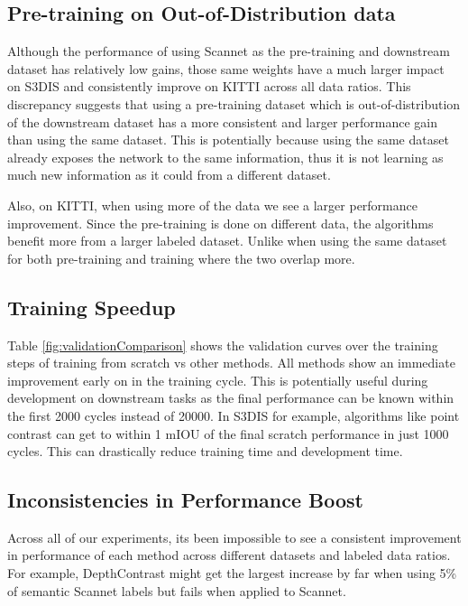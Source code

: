\documentclass[10pt,twocolumn,letterpaper]{article}
\begin{document}
\subsection{Pre-training on Out-of-Distribution data}
\label{sec:results:out-of-distribution}

Although the performance of using Scannet as the pre-training and downstream dataset has relatively low gains, those same weights have a much larger impact on S3DIS and consistently improve on KITTI across all data ratios. This discrepancy suggests that using a pre-training dataset which is out-of-distribution of the downstream dataset has a more consistent and larger performance gain than using the same dataset. This is potentially because using the same dataset already exposes the network to the same information, thus it is not learning as much new information as it could from a different dataset.

Also, on KITTI, when using more of the data we see a larger performance improvement. Since the pre-training is done on different data, the algorithms benefit more from a larger labeled dataset. Unlike when using the same dataset for both pre-training and training where the two overlap more.

\subsection{Training Speedup}
\label{sec:results:speedup}

Table \ref{fig:validationComparison} shows the validation curves over the training steps of training from scratch vs other methods. All methods show an immediate improvement early on in the training cycle. This is potentially useful during development on downstream tasks as the final performance can be known within the first 2000 cycles instead of 20000. In S3DIS for example, algorithms like point contrast can get to within 1 mIOU of the final scratch performance in just 1000 cycles. This can drastically reduce training time and development time.

\subsection{Inconsistencies in Performance Boost}
\label{sec:results:inconsistencies}

Across all of our experiments, its been impossible to see a consistent improvement in performance of each method across different datasets and labeled data ratios. For example, DepthContrast might get the largest increase by far when using 5\% of semantic Scannet labels but fails when applied to Scannet.
\end{document}

